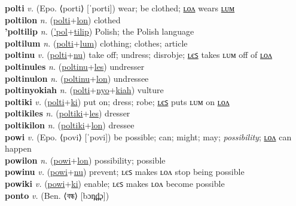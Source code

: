 \textbf{polti} \textit{v.} (Epo. ⟨porti⟩ [ˈporti])
wear; be clothed; \hyperref[poltilon]{ʟᴏᴧ} wears \hyperref[poltilum]{ʟᴜᴍ} \label{polti} \\
\textbf{poltilon} \textit{n.} (\hyperref[polti]{polti}+\hyperref[lon]{lon})
clothed \label{poltilon} \\
\textbf{'poltilip} \textit{n.} (\hyperref['pol]{'pol}+\hyperref[tilip]{tilip})
Polish; the Polish language \label{'poltilip} \\
\textbf{poltilum} \textit{n.} (\hyperref[polti]{polti}+\hyperref[lum]{lum})
clothing; clothes; article \label{poltilum} \\
\textbf{poltinu} \textit{v.} (\hyperref[polti]{polti}+\hyperref[nu]{nu})
take off; undress; disrobje; \hyperref[poltinules]{ʟєꜱ} takes ʟᴜᴍ off of \hyperref[poltinulon]{ʟᴏᴧ} \label{poltinu} \\
\textbf{poltinules} \textit{n.} (\hyperref[poltinu]{poltinu}+\hyperref[les]{les})
undresser \label{poltinules} \\
\textbf{poltinulon} \textit{n.} (\hyperref[poltinu]{poltinu}+\hyperref[lon]{lon})
undressee \label{poltinulon} \\
\textbf{poltinyokiah} \textit{n.} (\hyperref[polti]{polti}+\hyperref[nyo]{nyo}+\hyperref[kiah]{kiah})
vulture \label{poltinyokiah} \\
\textbf{poltiki} \textit{v.} (\hyperref[polti]{polti}+\hyperref[ki]{ki})
put on; dress; robe; \hyperref[poltikiles]{ʟєꜱ} puts ʟᴜᴍ on \hyperref[poltikilon]{ʟᴏᴧ} \label{poltiki} \\
\textbf{poltikiles} \textit{n.} (\hyperref[poltiki]{poltiki}+\hyperref[les]{les})
dresser \label{poltikiles} \\
\textbf{poltikilon} \textit{n.} (\hyperref[poltiki]{poltiki}+\hyperref[lon]{lon})
dressee \label{poltikilon} \\
\textbf{powi} \textit{v.} (Epo. ⟨povi⟩ [ˈpovi])
be possible; can; might; may; \textit{possibility}; \hyperref[powilon]{ʟᴏᴧ} can happen \label{powi} \\
\textbf{powilon} \textit{n.} (\hyperref[powi]{powi}+\hyperref[lon]{lon})
possibility; possible \label{powilon} \\
\textbf{powinu} \textit{v.} (\hyperref[powi]{powi}+\hyperref[nu]{nu})
prevent; ʟєꜱ makes ʟᴏᴧ stop being possible \label{powinu} \\
\textbf{powiki} \textit{v.} (\hyperref[powi]{powi}+\hyperref[ki]{ki})
enable; ʟєꜱ makes ʟᴏᴧ become possible \label{powiki} \\
\textbf{ponto} \textit{v.} (Ben. ⟨বন্ধ⟩ [bɔn̪d̪̤ɔ])
